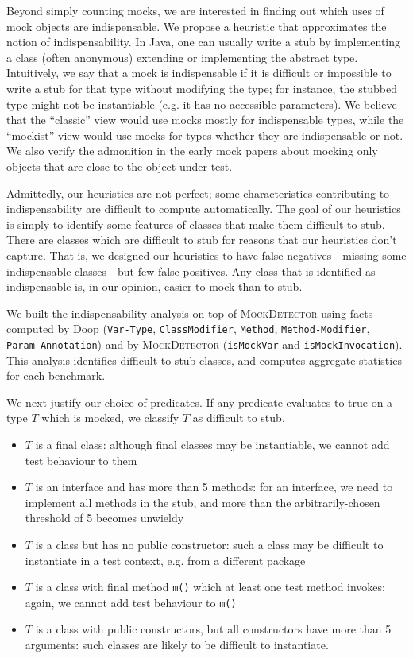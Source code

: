 Beyond simply counting mocks, we are interested in finding out which
uses of mock objects are indispensable.  We propose a heuristic that
approximates the notion of indispensability. In Java, one can usually
write a stub by implementing a class (often anonymous) extending or
implementing the abstract type. Intuitively, we say that a mock is
indispensable if it is difficult or impossible to write a stub for
that type without modifying the type; for instance, the stubbed type might
not be instantiable (e.g. it has no accessible parameters). We believe that
the ``classic'' view would use mocks mostly for indispensable types, while
the ``mockist'' view would use mocks for types whether they are indispensable or not.
We also verify the admonition in the early mock papers about mocking only objects
that are close to the object under test.

Admittedly, our heuristics are not perfect; some characteristics contributing
to indispensability are difficult to compute automatically. The goal of our heuristics
is simply to identify some features of classes that make them difficult to stub.
There are classes which are difficult to stub for reasons that our heuristics don't capture.
That is, we designed our heuristics to have false negatives---missing some indispensable
classes---but few false positives. Any class that is identified as indispensable is,
in our opinion, easier to mock than to stub.

We built the indispensability analysis on top of \textsc{MockDetector}
using facts computed by Doop
(\texttt{Var-Type}, \texttt{ClassModifier}, \texttt{Method}, \texttt{Method-Modifier}, \texttt{Param-Annotation})
and by \textsc{MockDetector} (\texttt{isMockVar}
and \texttt{isMockInvocation}). This analysis identifies difficult-to-stub classes, and
computes aggregate statistics for each benchmark.

We next justify our choice of predicates. If any predicate evaluates to true on a type $T$ which is mocked, we 
classify $T$ as difficult to stub.

\begin{itemize}
\item $T$ is a final class: although final classes may be instantiable, we cannot add test behaviour to them
\item $T$ is an interface and has more than 5 methods: for an interface, we need to implement all methods in the stub, and more than the arbitrarily-chosen threshold of 5 becomes unwieldy
\item $T$ is a class but has no public constructor: such a class may be difficult to instantiate in a test context, e.g. from a different package
\item $T$ is a class with final method \texttt{m()} which at least one test method invokes: again, we cannot add test behaviour to \texttt{m()}
\item $T$ is a class with public constructors, but all constructors have more than 5 arguments: such classes are likely to be difficult to instantiate.
\end{itemize}


